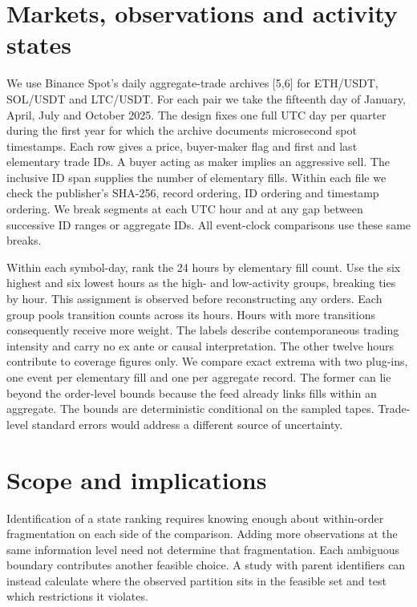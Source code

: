 \documentclass[11pt]{article}
\begin{document}


\section{Markets, observations and activity states}
We use Binance Spot's daily aggregate-trade archives [5,6] for ETH/USDT, SOL/USDT and LTC/USDT. For each pair we take the fifteenth day of January, April, July and October 2025. The design fixes one full UTC day per quarter during the first year for which the archive documents microsecond spot timestamps. Each row gives a price, buyer-maker flag and first and last elementary trade IDs. A buyer acting as maker implies an aggressive sell. The inclusive ID span supplies the number of elementary fills. Within each file we check the publisher's SHA-256, record ordering, ID ordering and timestamp ordering. We break segments at each UTC hour and at any gap between successive ID ranges or aggregate IDs. All event-clock comparisons use these same breaks.

Within each symbol-day, rank the 24 hours by elementary fill count. Use the six highest and six lowest hours as the high- and low-activity groups, breaking ties by hour. This assignment is observed before reconstructing any orders. Each group pools transition counts across its hours. Hours with more transitions consequently receive more weight. The labels describe contemporaneous trading intensity and carry no ex ante or causal interpretation. The other twelve hours contribute to coverage figures only. We compare exact extrema with two plug-ins, one event per elementary fill and one per aggregate record. The former can lie beyond the order-level bounds because the feed already links fills within an aggregate. The bounds are deterministic conditional on the sampled tapes. Trade-level standard errors would address a different source of uncertainty.





\section{Scope and implications}
Identification of a state ranking requires knowing enough about within-order fragmentation on each side of the comparison. Adding more observations at the same information level need not determine that fragmentation. Each ambiguous boundary contributes another feasible choice. A study with parent identifiers can instead calculate where the observed partition sits in the feasible set and test which restrictions it violates.
\end{document}
